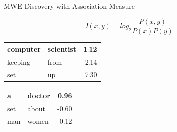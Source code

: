 \documentclass[serif, aspectratio=169]{beamer}
\begin{document}
\begin{frame}{MWE Discovery with Association Measure \citep{church_word_1989}} %
    \begin{center}
        \Large
        \begin{equation*}
            I(x, y) = log_2 \frac{P(x,y)}{P(x)P(y)} 
        \end{equation*}
    \end{center}
    \vfill
    \pause
    \begin{minipage}{0.45\columnwidth}
        \begin{table}
            \centering
            \renewcommand{\arraystretch}{1.5} 
            \begin{tabular}{|p{2cm}|p{2cm}|r|}
                \hline
                computer & scientist & 1.12 \\
                \hline
                keeping  & from      & 2.14 \\
                \hline
                set      & up        & 7.30 \\
                \hline
            \end{tabular}
        \end{table}
    \end{minipage}
    \hfill
    \begin{minipage}{0.45\columnwidth}
        \begin{table}
            \centering
            \renewcommand{\arraystretch}{1.5} 
            \begin{tabular}{|p{2cm}|p{2cm}|r|}
                \hline
                a   & doctor & 0.96  \\
                \hline
                set & about  & -0.60 \\
                \hline
                man & women  & -0.12 \\
                \hline
            \end{tabular}
        \end{table}
    \end{minipage}
\end{frame}
\end{document}
